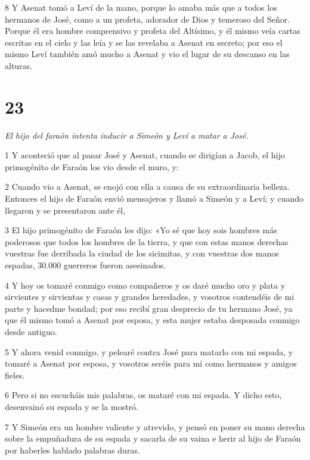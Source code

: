 \par 8 Y Asenat tomó a Leví de la mano, porque lo amaba más que a todos los hermanos de José, como a un profeta, adorador de Dios y temeroso del Señor. Porque él era hombre comprensivo y profeta del Altísimo, y él mismo veía cartas escritas en el cielo y las leía y se las revelaba a Asenat en secreto; por eso el mismo Leví también amó mucho a Asenat y vio el lugar de su descanso en las alturas.

\chapter{23}

\par \textit{El hijo del faraón intenta inducir a Simeón y Leví a matar a José.}


\par 1 Y aconteció que al pasar José y Asenat, cuando se dirigían a Jacob, el hijo primogénito de Faraón los vio desde el muro, y:

\par 2 Cuando vio a Asenat, se enojó con ella a causa de su extraordinaria belleza. Entonces el hijo de Faraón envió mensajeros y llamó a Simeón y a Leví; y cuando llegaron y se presentaron ante él,

\par 3 El hijo primogénito de Faraón les dijo: «Yo sé que hoy sois hombres más poderosos que todos los hombres de la tierra, y que con estas manos derechas vuestras fue derribada la ciudad de los sicimitas, y con vuestras dos manos espadas, 30.000 guerreros fueron asesinados.

\par 4 Y hoy os tomaré conmigo como compañeros y os daré mucho oro y plata y sirvientes y sirvientas y casas y grandes heredades, y vosotros contendéis de mi parte y hacedme bondad; por eso recibí gran desprecio de tu hermano José, ya que él mismo tomó a Asenat por esposa, y esta mujer estaba desposada conmigo desde antiguo.

\par 5 Y ahora venid conmigo, y pelearé contra José para matarlo con mi espada, y tomaré a Asenat por esposa, y vosotros seréis para mí como hermanos y amigos fieles.

\par 6 Pero si no escucháis mis palabras, os mataré con mi espada. Y dicho esto, desenvainó su espada y se la mostró.

\par 7 Y Simeón era un hombre valiente y atrevido, y pensó en poner su mano derecha sobre la empuñadura de su espada y sacarla de su vaina e herir al hijo de Faraón por haberles hablado palabras duras.

